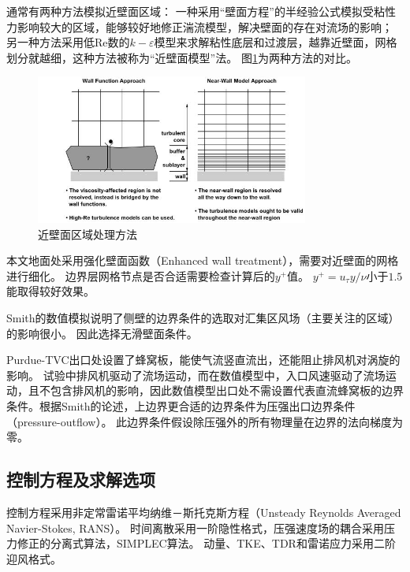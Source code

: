 通常有两种方法模拟近壁面区域：
一种采用“壁面方程”的半经验公式模拟受粘性力影响较大的区域，能够较好地修正湍流模型，解决壁面的存在对流场的影响；
另一种方法采用低$\mathrm{Re}$数的$k-\varepsilon$模型来求解粘性底层和过渡层，越靠近壁面，网格划分就越细，这种方法被称为“近壁面模型”法。
图\ref{fig:wall-treatment}为两种方法的对比\cite{fluent2015theory}。
\begin{figure}[!htbp]
  \centering
  \includegraphics[width=0.8\textwidth]{tornado-simulation/fig/wall_treatment.jpg}
  \caption{近壁面区域处理方法}
  \label{fig:wall-treatment}
\end{figure}

本文地面处采用强化壁面函数（Enhanced wall treatment\cite{fluent2015user}），需要对近壁面的网格进行细化。
边界层网格节点是否合适需要检查计算后的$y^{+}$值。
$y^{+}=u_{\tau} y/\nu$小于$1.5$能取得较好效果。

Smith的数值模拟\cite{smith1987effect}说明了侧壁的边界条件的选取对汇集区风场（主要关注的区域）的影响很小。
因此选择无滑壁面条件。

Purdue-TVC出口处设置了蜂窝板，能使气流竖直流出，还能阻止排风机对涡旋的影响。
试验中排风机驱动了流场运动，而在数值模型中，入口风速驱动了流场运动，且不包含排风机的影响，因此数值模型出口处不需设置代表直流蜂窝板的边界条件。根据Smith\cite{smith1987effect}的论述，上边界更合适的边界条件为压强出口边界条件（pressure-outflow）。
此边界条件假设除压强外的所有物理量在边界的法向梯度为零\cite{fluent2015user}。




\subsection{控制方程及求解选项}
控制方程采用非定常雷诺平均纳维－斯托克斯方程（Unsteady Reynolds Averaged Navier-Stokes, RANS）。
时间离散采用一阶隐性格式，压强速度场的耦合采用压力修正的分离式算法，SIMPLEC算法。
动量、TKE、TDR和雷诺应力采用二阶迎风格式。

